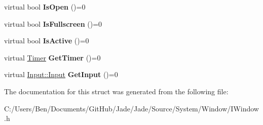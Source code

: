 \begin{DoxyCompactItemize}
\item 
\hypertarget{struct_jade_1_1_system_1_1_i_window_a334e475db667839044a87d17452c85e8}{}virtual bool {\bfseries Is\+Open} ()=0\label{struct_jade_1_1_system_1_1_i_window_a334e475db667839044a87d17452c85e8}

\item 
\hypertarget{struct_jade_1_1_system_1_1_i_window_a1431c2abbaf150947bbd2321d194c298}{}virtual bool {\bfseries Is\+Fullscreen} ()=0\label{struct_jade_1_1_system_1_1_i_window_a1431c2abbaf150947bbd2321d194c298}

\item 
\hypertarget{struct_jade_1_1_system_1_1_i_window_a2ed18cb232956c62866a853c7f99355d}{}virtual bool {\bfseries Is\+Active} ()=0\label{struct_jade_1_1_system_1_1_i_window_a2ed18cb232956c62866a853c7f99355d}

\item 
\hypertarget{struct_jade_1_1_system_1_1_i_window_ad40851ac1f25136175e56f63fc340b8d}{}virtual \hyperlink{class_jade_1_1_system_1_1_timer}{Timer} {\bfseries Get\+Timer} ()=0\label{struct_jade_1_1_system_1_1_i_window_ad40851ac1f25136175e56f63fc340b8d}

\item 
\hypertarget{struct_jade_1_1_system_1_1_i_window_ab0738f1d70a80f0071614a4ced107b7b}{}virtual \hyperlink{struct_jade_1_1_input_1_1_input}{Input\+::\+Input} {\bfseries Get\+Input} ()=0\label{struct_jade_1_1_system_1_1_i_window_ab0738f1d70a80f0071614a4ced107b7b}

\end{DoxyCompactItemize}


The documentation for this struct was generated from the following file\+:\begin{DoxyCompactItemize}
\item 
C\+:/\+Users/\+Ben/\+Documents/\+Git\+Hub/\+Jade/\+Jade/\+Source/\+System/\+Window/I\+Window.\+h\end{DoxyCompactItemize}
